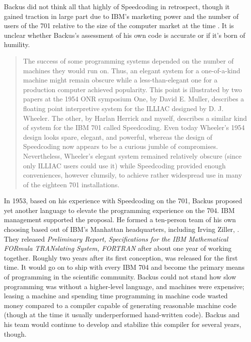 Backus did not think all that highly of Speedcoding in retrospect, though it
gained traction in large part due to IBM's marketing power and the number of
users of the 701 relative to the size of the computer market at the time
\cite{Backus_1980_Programming_in_America_in_1950s}. It is unclear whether
Backus's assessment of his own code is accurate or if it's born of humility.

\begin{quotation}
  The success of some programming systems depended on the number of machines
  they would run on. Thus, an elegant system for a one-of-a-kind machine might
  remain obscure while a less-than-elegant one for a production
  computer achieved
  popularity. This point is illustrated by two papers at the 1954 ONR symposium
  One, by David E. Muller, describes a floating point interpretive system for
  the ILLIAC designed by D. J. Wheeler. The other, by Harlan Herrick and myself,
  describes a similar kind of system for the IBM 701 called Speedcoding. Even
  today Wheeler's 1954 design looks spare, elegant, and powerful, whereas the
  design of Speedcoding now appears to be a curious jumble of compromises.
  Nevertheless, Wheeler's elegant system remained relatively obscure (since only
  ILLIAC users could use it) while Speedcoding provided enough conveniences,
  however clumsily, to achieve rather widespread use in many of the eighteen 701
  installations.
\end{quotation}

In 1953, based on his experience with Speedcoding on the 701, Backus proposed
yet another language to elevate the programming experience on the 704. IBM
management supported the proposal. He formed a ten-person team of his own
choosing based out of IBM's Manhattan headquarters, including Irving Ziller,
. They released \textit{Preliminary Report,
  Specifications for the IBM Mathematical FORmula TRANslating System,
FORTRAN}\cite{IBM_1954_FORTRAN_Specifications} after about one year of working
together. Roughly two years after its first conception, \FTN{} was released for
the first time. It would go on to ship with every IBM 704 and become the
primary means of programming in the scientific community. Backus could not
stand how slow programming was without a higher-level language, and machines
were expensive; leasing a machine and spending time programming in machine code
wasted money compared to a compiler capable of generating reasonable machine
code (though at the time it usually underperformed hand-written code). Backus
and his team would continue to develop and stabilize this compiler for several
years, though.

